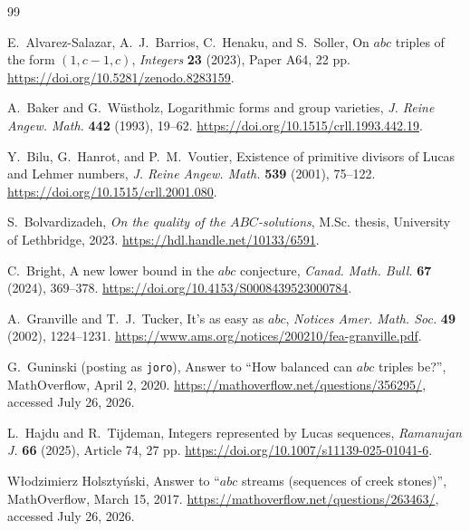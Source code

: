 \documentclass[11pt]{article}
\theoremstyle{remark}
\begin{document}
\begin{thebibliography}{99}

E.~Alvarez-Salazar, A.~J.~Barrios, C.~Henaku, and S.~Soller,
\newblock On \(abc\) triples of the form \((1,c-1,c)\),
\newblock \emph{Integers} \textbf{23} (2023), Paper A64, 22 pp.
\newblock \url{https://doi.org/10.5281/zenodo.8283159}.

A.~Baker and G.~W{\"u}stholz,
\newblock Logarithmic forms and group varieties,
\newblock \emph{J. Reine Angew. Math.} \textbf{442} (1993), 19--62.
\newblock \url{https://doi.org/10.1515/crll.1993.442.19}.

Y.~Bilu, G.~Hanrot, and P.~M.~Voutier,
\newblock Existence of primitive divisors of Lucas and Lehmer numbers,
\newblock \emph{J. Reine Angew. Math.} \textbf{539} (2001), 75--122.
\newblock \url{https://doi.org/10.1515/crll.2001.080}.

S.~Bolvardizadeh,
\newblock \emph{On the quality of the \(ABC\)-solutions},
\newblock M.Sc. thesis, University of Lethbridge, 2023.
\newblock \url{https://hdl.handle.net/10133/6591}.

C.~Bright,
\newblock A new lower bound in the \(abc\) conjecture,
\newblock \emph{Canad. Math. Bull.} \textbf{67} (2024), 369--378.
\newblock \url{https://doi.org/10.4153/S0008439523000784}.

A.~Granville and T.~J.~Tucker,
\newblock It's as easy as \(abc\),
\newblock \emph{Notices Amer. Math. Soc.} \textbf{49} (2002),
1224--1231.
\newblock \url{https://www.ams.org/notices/200210/fea-granville.pdf}.

G.~Guninski (posting as \texttt{joro}),
\newblock Answer to ``How balanced can \(abc\) triples be?'',
\newblock MathOverflow, April 2, 2020.
\newblock \url{https://mathoverflow.net/questions/356295/},
accessed July 26, 2026.

L.~Hajdu and R.~Tijdeman,
\newblock Integers represented by Lucas sequences,
\newblock \emph{Ramanujan J.} \textbf{66} (2025), Article 74, 27 pp.
\newblock \url{https://doi.org/10.1007/s11139-025-01041-6}.

W{\l}odzimierz Holszty\'nski,
\newblock Answer to ``\(abc\) streams (sequences of creek stones)'',
\newblock MathOverflow, March 15, 2017.
\newblock \url{https://mathoverflow.net/questions/263463/},
accessed July 26, 2026.


\end{thebibliography}
\end{document}
